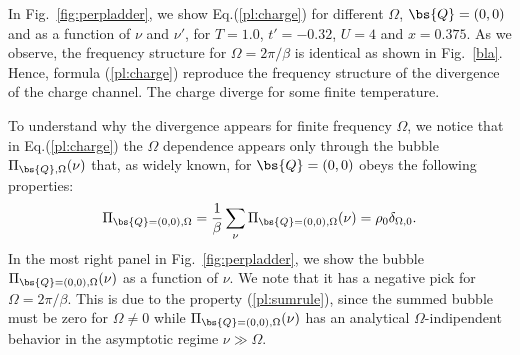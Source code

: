 In Fig.~\ref{fig:perpladder}, we show Eq.(\ref{pl:charge}) for different $\Omega$, $\bs{Q}=(0,0)$ and as a function of $\nu$ and $\nu'$, 
for $T=1.0$, $t'=-0.32$, $U=4$ and $x=0.375$. 
As we observe, the frequency structure for $\Omega=2\pi/ \beta$ is identical as shown in Fig.~\ref{bla}. Hence, formula (\ref{pl:charge}) 
reproduce the frequency structure of the divergence of the charge channel. The charge diverge for some finite temperature.

To understand why the divergence appears for finite frequency $\Omega$, we notice that in Eq.(\ref{pl:charge}) the $\Omega$ dependence 
appears only through the bubble $\Pi_{\bs{Q},\Omega}(\nu)$ that, as widely known, for $\bs{Q}=(0,0)$ obeys 
the following properties:
\begin{equation}
	\Pi_{\bs{Q}=(0,0),\Omega} = \frac{1}{\beta} \sum_{\nu} \Pi_{\bs{Q}=(0,0),\Omega}(\nu) = \rho_{0} \delta_{\Omega,0}.
\label{pl:sumrule}
\end{equation}
In the most right panel in Fig.~\ref{fig:perpladder}, we show the bubble $\Pi_{\bs{Q}=(0,0),\Omega}(\nu)$ as a function of $\nu$.
We note that it has a negative pick for $\Omega=2\pi/ \beta$. This is due to the property (\ref{pl:sumrule}), since the summed 
bubble must be zero for $\Omega \neq 0$ while $\Pi_{\bs{Q}=(0,0),\Omega}(\nu)$ has an analytical $\Omega$-indipendent behavior 
in the asymptotic regime $\nu \gg \Omega$.

